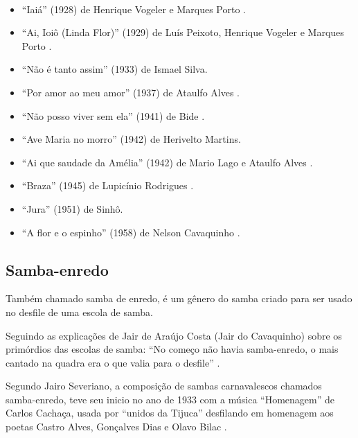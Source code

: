 \begin{example} ~

\begin{itemize}
\item ``Iaiá'' (1928) de Henrique Vogeler e Marques Porto \cite[pp. 684,999]{marcondes1977enciclopediav2} \cite[pp. 63]{reinato2010musica}.
\item ``Ai, Ioiô (Linda Flor)'' (1929) de Luís Peixoto, Henrique Vogeler e Marques Porto \cite[pp. 684,899]{marcondes1977enciclopediav2} \cite[pp. 128]{perna2002samba} \cite[pp. 291]{dourado2004dicionario}.

\item ``Não é tanto assim'' (1933) de Ismael Silva\cite{subgenerosdosamba2}.
\item ``Por amor ao meu amor'' (1937) de Ataulfo Alves  \cite{subgenerosdosamba2}.
\item ``Não posso viver sem ela'' (1941) de Bide \cite{subgenerosdosamba2}.
\item ``Ave Maria no morro'' (1942) de Herivelto Martins\cite{subgenerosdosamba2}.
\item ``Ai que saudade da Amélia'' (1942) de Mario Lago e Ataulfo Alves \cite{subgenerosdosamba2}.
\item ``Braza'' (1945) de Lupicínio Rodrigues \cite{subgenerosdosamba2}.
\item ``Jura'' (1951) de Sinhô\cite{subgenerosdosamba2}.
\item ``A flor e o espinho'' (1958) de Nelson Cavaquinho \cite{subgenerosdosamba2}.
\end{itemize}
\end{example}


\subsection{Samba-enredo}
Também chamado samba de enredo, é um gênero do samba criado para ser usado no desfile de uma escola de samba.

Seguindo as explicações de Jair de Araújo Costa (Jair do Cavaquinho) sobre os primórdios das escolas de samba: 
``No começo não havia samba-enredo, o mais cantado na quadra era o que valia para o desfile'' \cite[pp. 85]{de2003tem}.


Segundo Jairo Severiano, a composição de sambas carnavalescos chamados samba-enredo,
teve seu inicio no ano de 1933 com a música ``Homenagem'' de Carlos Cachaça, usada por ``unidos da Tijuca''
desfilando em homenagem aos poetas Castro Alves, Gonçalves Dias e Olavo Bilac  \cite{rizzi2016musica}.

